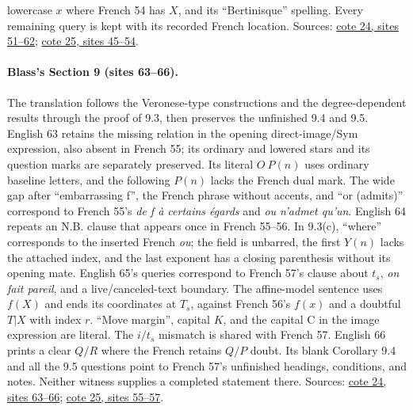 \documentclass[10pt,a4paper]{article}
\begin{document}
lowercase $x$ where French 54 has $X$, and its ``Bertinisque'' spelling. Every remaining query is kept with its recorded French location. Sources: \href{https://grothendieck.umontpellier.fr/web/viewer.html?file=../24.pdf\#page=52}{cote 24, sites 51--62}; \href{https://grothendieck.umontpellier.fr/web/viewer.html?file=../25.pdf\#page=46}{cote 25, sites 45--54}.

\paragraph{Blass's Section 9 (sites 63--66).}
The translation follows the Veronese-type constructions and the degree-dependent results through the proof of 9.3, then preserves the unfinished 9.4 and 9.5. English 63 retains the missing relation in the opening direct-image/Sym expression, also absent in French 55; its ordinary and lowered stars and its question marks are separately preserved. Its literal $O\ P(n)$ uses ordinary baseline letters, and the following $P(n)$ lacks the French dual mark. The wide gap after ``embarrassing f'', the French phrase without accents, and ``or (admits)'' correspond to French 55's \emph{de f à certains égards} and \emph{ou n'admet qu'un}. English 64 repeats an N.B. clause that appears once in French 55--56. In 9.3(c), ``where'' corresponds to the inserted French \emph{ou}; the field is unbarred, the first $Y(n)$ lacks the attached index, and the last exponent has a closing parenthesis without its opening mate. English 65's queries correspond to French 57's clause about $t_s$, \emph{on fait pareil}, and a live/canceled-text boundary. The affine-model sentence uses $f(X)$ and ends its coordinates at $T_s$, against French 56's $f(x)$ and a doubtful $T|X$ with index $r$. ``Move margin'', capital $K$, and the capital C in the image expression are literal. The $i/t_s$ mismatch is shared with French 57. English 66 prints a clear $Q/R$ where the French retains $Q/P$ doubt. Its blank Corollary 9.4 and all the 9.5 questions point to French 57's unfinished headings, conditions, and notes. Neither witness supplies a completed statement there. Sources: \href{https://grothendieck.umontpellier.fr/web/viewer.html?file=../24.pdf\#page=64}{cote 24, sites 63--66}; \href{https://grothendieck.umontpellier.fr/web/viewer.html?file=../25.pdf\#page=56}{cote 25, sites 55--57}.
\end{document}
